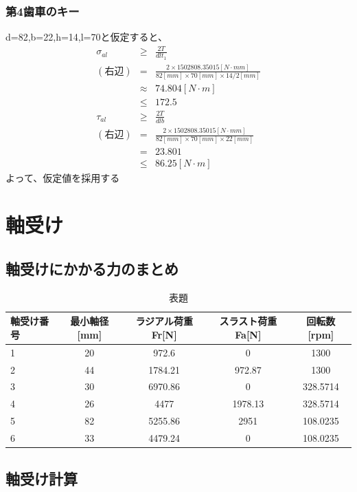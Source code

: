 \documentclass[a4j,twoside,openright,11pt]{jreport}
\begin{document}
\subsection{第4歯車のキー}
d=82,b=22,h=14,l=70と仮定すると、
\begin{eqnarray}
\sigma_{al} &\geq& \frac{2T}{dlt_1}\\
(右辺) &=& \frac{2 \times 1502808.35015[N \cdot mm]}{82[mm] \times 70[mm] \times 14/2[mm]}\\
       &\approx&74.804[N \cdot m]\\
       &\leq& 172.5\\
\tau_{al} &\geq& \frac{2T}{dlb}\\
(右辺) &=& \frac{2 \times 1502808.35015[N \cdot mm]}{82[mm] \times 70[mm] \times 22[mm]}\\
       &=& 23.801\\
       &\leq&86.25[N \cdot m]
\end{eqnarray}
よって、仮定値を採用する

\chapter{軸受け}
\section{軸受けにかかる力のまとめ}
\begin{table}[htb]
\begin{center}
  \caption{表題}
  \begin{tabular}{|l||c|c|c|c|} \hline
軸受け番号& 最小軸径[mm] &ラジアル荷重Fr[N] &スラスト荷重Fa[N]&回転数[rpm]\\\hline
1&20&972.6&0&1300\\
2&44&1784.21&972.87&1300\\
3&30&6970.86&0&328.5714\\
4&26&4477&1978.13&328.5714\\
5&82&5255.86&2951&108.0235\\
6&33&4479.24&0&108.0235\\
\hline
  \end{tabular}
\end{center}
\end{table}





\section{軸受け計算}
\newpage
\end{document}
